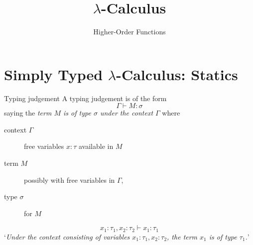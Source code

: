 
\title{$\lambda$-Calculus}
\subtitle{Higher-Order Functions}


{
\begin{frame}\maketitle\end{frame}}

\section{Simply Typed $\lambda$-Calculus: Statics}

\begin{frame}{Typing judgement}
  A \alert{typing judgement} is of the form
  \[
    \Gamma \vdash M : \sigma
  \]
  saying the \emph{term $M$ is of type $\sigma$ under the context $\Gamma$}
  where 
  \begin{description}
    \item[context $\Gamma$] free variables $x : \tau$ available in $M$
    \item[term $M$] possibly with free variables in $\Gamma$,
    \item[type $\sigma$] for $M$
  \end{description}

  \[
    x_1:\tau_1, x_2: \tau_2 \vdash x_1 : \tau_1
  \]
  `\emph{Under the context consisting of variables $x_1:\tau_1, x_2:\tau_2$, the term $x_1$ is of type $\tau_1$.}'
\end{frame}

